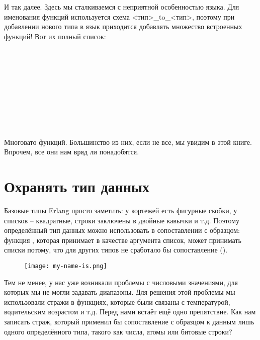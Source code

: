 И так далее.
Здесь мы сталкиваемся с неприятной особенностью языка.
Для именования функций используется схема <тип>\_to\_<тип>, поэтому при добавлении нового типа в язык приходится добавлять множество встроенных функций!
Вот их полный список:\\
\\
\\
\\
\\
\\
\\
\\
\\
\\

Многовато функций.
Большинство из них, если не все, мы увидим в этой книге.
Впрочем, все они нам вряд ли понадобятся.
\section{Охранять тип данных}
Базовые типы Erlang просто заметить: у кортежей есть фигурные скобки, у списков \--- квадратные, строки заключены в двойные кавычки и т.д.
Поэтому определённый тип данных можно использовать в сопоставлении с образцом: функция , которая принимает в качестве аргумента список, может принимать списки потому, что для других типов не сработало бы сопоставление (\ops{[H|\_]}).
\begin{figure}[h!]
    \centering
    \texttt{[image: my-name-is.png]}
\end{figure} 

Тем не менее, у нас уже возникали проблемы с числовыми значениями, для которых мы не могли задавать диапазоны.
Для решения этой проблемы мы использовали стражи в функциях, которые были связаны с температурой, водительским возрастом и т.д.
Перед нами встаёт ещё одно препятствие.
Как нам записать страж, который применил бы сопоставление с образцом к данным лишь одного определённого типа, такого как числа, атомы или битовые строки?

